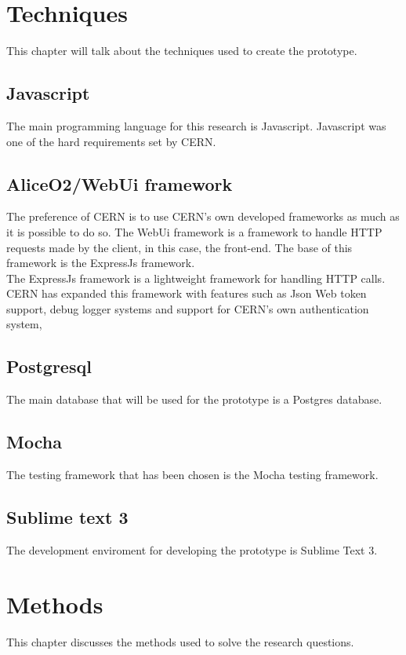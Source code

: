 \documentclass[paper=a4, fontsize=11pt,twoside]{scrartcl}	%
\begin{document}
 

\newpage
\section{Techniques}
This chapter will talk about the techniques used to create the prototype.

\subsection{Javascript}
The main programming language for this research is Javascript. Javascript was one of the hard requirements set by CERN.

\subsection{AliceO2/WebUi framework}
The preference of CERN is to use CERN's own developed frameworks as much as it is possible to do so. The WebUi framework is a framework to handle HTTP requests made by the client, in this case, the front-end. The base of this framework is the ExpressJs framework. \\
The ExpressJs framework is a lightweight framework for handling HTTP calls. CERN has expanded this framework with features such as Json Web token support, debug logger systems and support for CERN's own authentication system,

\subsection{Postgresql}
The main database that will be used for the prototype is a Postgres database. 

\subsection{Mocha}
The testing framework that has been chosen is the Mocha testing framework.

\subsection{Sublime text 3}
The development enviroment for developing the prototype is Sublime Text 3.

\newpage


\section{Methods}
This chapter discusses the methods used to solve the research questions.
\end{document}
